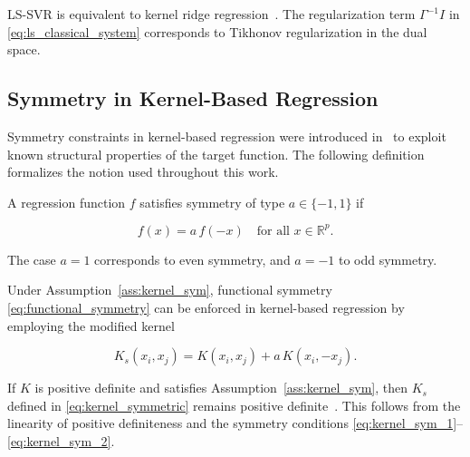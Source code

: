\documentclass[mathematics,article,submit,pdftex,moreauthors]{Definitions/mdpi}
\begin{document}
\begin{Remark}\label{rem:ls_ridge}
LS-SVR is equivalent to kernel ridge regression~\cite{Scholkopf2002}. The regularization term $\Gamma^{-1}I$ 
in \eqref{eq:ls_classical_system} corresponds to Tikhonov regularization in the dual space.
\end{Remark}


\subsection{Symmetry in Kernel-Based Regression}\label{subsec:symmetry}

Symmetry constraints in kernel-based regression were introduced in~\cite{Espinoza2005,Espinoza2006} 
to exploit known structural properties of the target function. 
The following definition formalizes the notion used throughout this work.

\begin{Definition}\label{def:functional_symmetry}
A regression function $f$ satisfies symmetry of type $a \in \{-1,1\}$ if
\begin{linenomath}
\begin{equation}\label{eq:functional_symmetry}
f(x) = a\,f(-x) \quad \text{for all } x \in \mathbb{R}^p.
\end{equation}
\end{linenomath}
The case $a = 1$ corresponds to even symmetry, and $a = -1$ to odd symmetry.
\end{Definition}

Under Assumption~\ref{ass:kernel_sym}, functional symmetry \eqref{eq:functional_symmetry} 
can be enforced in kernel-based regression by employing the modified kernel
\begin{linenomath}
\begin{equation}\label{eq:kernel_symmetric}
K_s(x_i,x_j) = K(x_i,x_j) + a\,K(x_i,-x_j).
\end{equation}
\end{linenomath}

\begin{Remark}\label{rem:kernel_pd_preservation}
If $K$ is positive definite and satisfies Assumption~\ref{ass:kernel_sym},
then $K_s$ defined in \eqref{eq:kernel_symmetric} remains positive definite~\cite{Steinwart2008}.
This follows from the linearity of positive definiteness and the symmetry conditions 
\eqref{eq:kernel_sym_1}--\eqref{eq:kernel_sym_2}.
\end{Remark}
\end{document}
